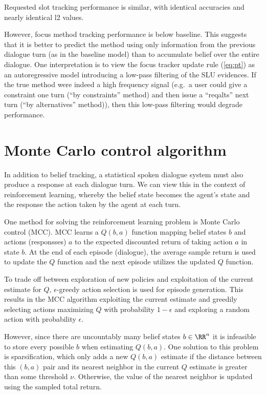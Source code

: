 \documentclass[a4paper,oneside,reqno]{amsart}
\begin{document}
Requested slot tracking performance is similar, with identical accuracies
and nearly identical l2 values.

However, focus method tracking performance is below baseline. This suggests
that it is better to predict the method using only information from the
previous dialogue turn (as in the baseline model) than to accumulate belief
over the entire dialogue. One interpretation is to view the focus tracker
update rule (\autoref{eq:pt}) as an autoregressive model introducing a low-pass
filtering of the SLU evidences. If the true method were indeed a high frequency
signal (e.g.\ a user could give a constraint one turn (``by constraints''
method) and then issue a ``reqalts'' next turn (``by alternatives'' method)),
then this low-pass filtering would degrade performance.

\section{Monte Carlo control algorithm}

In addition to belief tracking, a statistical spoken dialogue system must also
produce a response at each dialogue turn. We can view this in the context of
reinforcement learning, whereby the belief state becomes the agent's state
and the response the action taken by the agent at each turn.

One method for solving the reinforcement learning problem is Monte Carlo
control (MCC).  MCC learns a $Q(b,a)$ function mapping belief states $b$ and
actions (responsses) $a$ to the expected discounted return of taking action $a$
in state $b$. At the end of each episode (dialogue), the average sample return
is used to update the $Q$ function and the next episode utilizes the updated
$Q$ function.

To trade off between exploration of new policies and exploitation of the current
estimate for $Q$, $\epsilon$-greedy action selection is used for episode generation.
This results in the MCC algorithm exploiting the current estimate and greedily
selecting actions maximizing $Q$ with probability $1 - \epsilon$ and exploring a random
action with probability $\epsilon$.

However, since there are uncountably many belief states $b \in \RR^n$ it is
infeasible to store every possible $b$ when estimating $Q(b,a)$. One solution
to this problem is sparsification, which only adds a new $Q(b,a)$ estimate if
the distance between this $(b,a)$ pair and its nearest neighbor in the current
$Q$ estimate is greater than some threshold $\nu$. Otherwise, the value of the
nearest neighbor is updated using the sampled total return.
\end{document}
